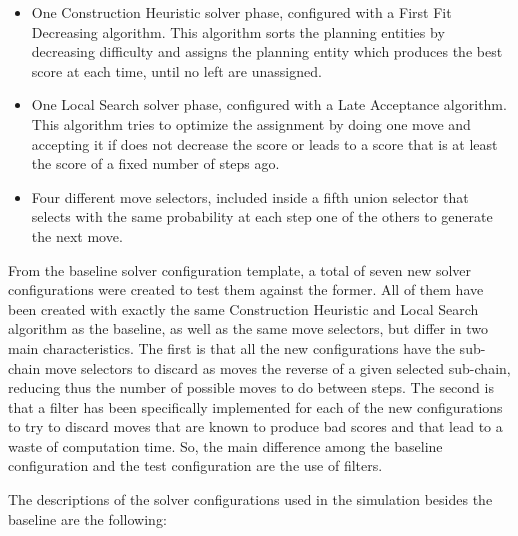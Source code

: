 \documentclass[runningheads,a4paper]{llncs}
\begin{document}
\begin{itemize}
  \item One Construction Heuristic solver phase, configured with a First Fit Decreasing algorithm. This algorithm sorts the planning entities by decreasing difficulty and assigns the planning entity which produces the best score at each time, until no left are unassigned.
  \item One Local Search solver phase, configured with a Late Acceptance algorithm. This algorithm tries to optimize the assignment by doing one move and accepting it if does not decrease the score or leads to a score that is at least the score of a fixed number of steps ago.
  \item Four different move selectors, included inside a fifth union selector that selects with the same probability at each step one of the others to generate the next move.
\end{itemize}

From the baseline solver configuration template, a total of seven new solver configurations were created to test them against the former. All of them have been created with exactly the same Construction Heuristic and Local Search algorithm as the baseline, as well as the same move selectors, but differ in two main characteristics. The first is that all the new configurations have the sub-chain move selectors to discard as moves the reverse of a given selected sub-chain, reducing thus the number of possible moves to do between steps. The second is that a filter has been specifically implemented for each of the new configurations to try to discard moves that are known to produce bad scores and that lead to a waste of computation time. So, the main difference among the baseline configuration and the test configuration are the use of filters.

The descriptions of the solver configurations used in the simulation besides the baseline are the following:
\end{document}
